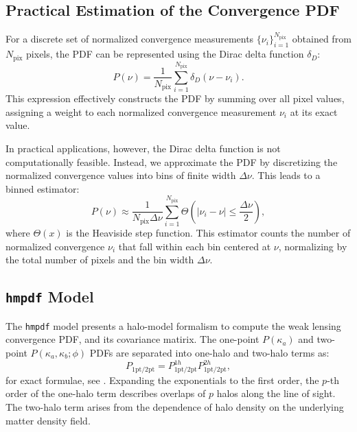 \subsection{Practical Estimation of the Convergence PDF}
For a discrete set of normalized convergence measurements \(\{\nu_i\}_{i=1}^{N_{\mathrm{pix}}}\) obtained from \(N_{\mathrm{pix}}\) pixels, the PDF can be represented using the Dirac delta function \(\delta_D\):
\begin{equation}
    P(\nu) = \frac{1}{N_{\mathrm{pix}}} \sum_{i=1}^{N_{\mathrm{pix}}} \delta_D(\nu - \nu_i).
    \label{eq:pdf_delta}
\end{equation}
This expression effectively constructs the PDF by summing over all pixel values, assigning a weight to each normalized convergence measurement \(\nu_i\) at its exact value.

In practical applications, however, the Dirac delta function is not computationally feasible. Instead, we approximate the PDF by discretizing the normalized convergence values into bins of finite width \(\Delta\nu\). This leads to a binned estimator:
\begin{equation}
    P(\nu) \approx \frac{1}{N_{\mathrm{pix}} \Delta\nu} \sum_{i=1}^{N_{\mathrm{pix}}} \Theta\left(\left|\nu_i - \nu\right| \leq \frac{\Delta\nu}{2}\right),
    \label{eq:pdf_binned}
\end{equation}
where \(\Theta(x)\) is the Heaviside step function. This estimator counts the number of normalized convergence \(\nu_i\) that fall within each bin centered at \(\nu\), normalizing by the total number of pixels and the bin width \(\Delta\nu\).

\subsection{\texttt{hmpdf} Model}
The \texttt{hmpdf} model \citep{2020PhRvD.102l3545T} presents a halo-model formalism to compute the weak lensing convergence PDF, and its covariance matirix. The one-point $P(\kappa_a)$ and two-point $P(\kappa_a, \kappa_b; \phi)$ PDFs are separated into one-halo and two-halo terms as:
\begin{equation}
    P_{\text{1pt/2pt}} = P^{1h}_{\text{1pt/2pt}}P^{2h}_{\text{1pt/2pt}},
    \label{eq:hmpdf}
\end{equation}
for exact formulae, see \cite{2020PhRvD.102l3545T}. Expanding the exponentials to the first order, the $p$-th order of the one-halo term describes overlaps of $p$ halos along the line of sight. The two-halo term arises from the dependence of halo density on the underlying matter density field.

